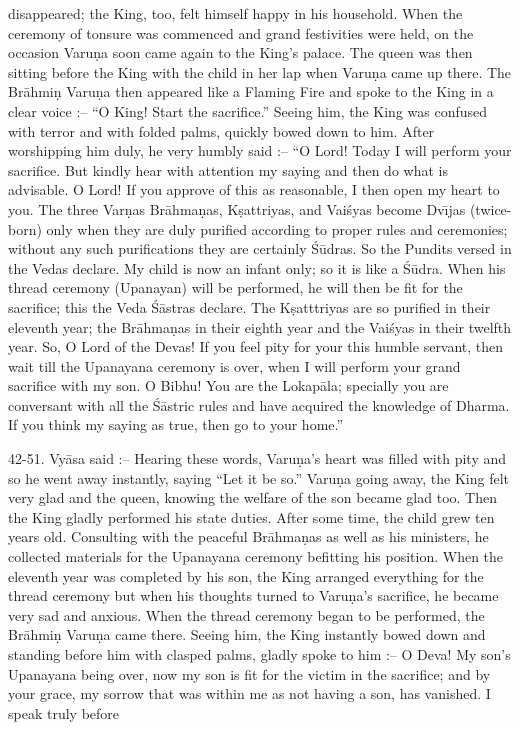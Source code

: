 disappeared; the King, too, felt himself happy in his household. When the ceremony of tonsure was commenced and grand festivities were held, on the occasion Varu\d{n}a soon came again to the King's palace. The queen was then sitting before the King with the child in her lap when Varu\d{n}a came up there. The Br\=ahmi\d{n} Varu\d{n}a then appeared like a Flaming Fire and spoke to the King in a clear voice :-- ``O King! Start the sacrifice.'' Seeing him, the King was confused with terror and with folded palms, quickly bowed down to him. After worshipping him duly, he very humbly said :-- ``O Lord! Today I will perform your sacrifice. But kindly hear with attention my saying and then do what is advisable. O Lord! If you approve of this as reasonable, I then open my heart to you. The three Var\d{n}as Br\=ahma\d{n}as, K\d{s}attriyas, and Vai\'syas become Dv\={\i}jas (twice-born) only when they are duly purified according to proper rules and ceremonies; without any such purifications they are certainly \'S\=udras. So the Pundits versed in the Vedas declare. My child is now an infant only; so it is like a \'S\=udra. When his thread ceremony (Upanayan) will be performed, he will then be fit for the sacrifice; this the Veda \'S\=astras declare. The K\d{s}atttriyas are so purified in their eleventh year; the Br\=ahma\d{n}as in their eighth year and the Vai\'syas in their twelfth year. So, O Lord of the Devas! If you feel pity for your this humble servant, then wait till the Upanayana ceremony is over, when I will perform your grand sacrifice with my son. O Bibhu! You are the Lokap\=ala; specially you are conversant with all the \'S\=astric rules and have acquired the knowledge of Dharma. If you think my saying as true, then go to your home.''

42-51. Vy\=asa said :-- Hearing these words, Varu\d{n}a's heart was filled with pity and so he went away instantly, saying ``Let it be so.'' Varu\d{n}a going away, the King felt very glad and the queen, knowing the welfare of the son became glad too. Then the King gladly performed his state duties. After some time, the child grew ten years old. Consulting with the peaceful Br\=ahma\d{n}as as well as his ministers, he collected materials for the Upanayana ceremony befitting his position. When the eleventh year was completed by his son, the King arranged everything for the thread ceremony but when his thoughts turned to Varu\d{n}a's sacrifice, he became very sad and anxious. When the thread ceremony began to be performed, the Br\=ahmi\d{n} Varu\d{n}a came there. Seeing him, the King instantly bowed down and standing before him with clasped palms, gladly spoke to him :-- O Deva! My son's Upanayana being over, now my son is fit for the victim in the sacrifice; and by your grace, my sorrow that was within me as not having a son, has vanished. I speak truly before

